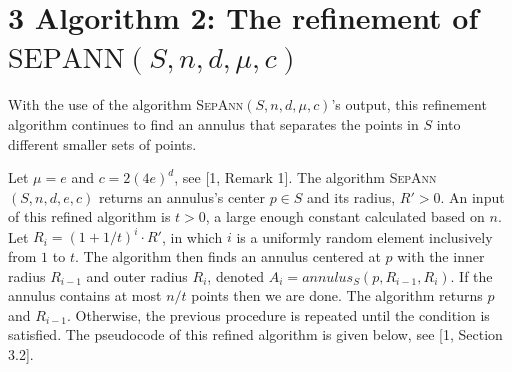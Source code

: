 \documentclass[12pt,english,]{article}
\newcommand{\pnt}[1]{{\scriptstyle#1}}
\let\origfigure\figure
\let\endorigfigure\endfigure
\renewenvironment{figure}[1][2] {
    \expandafter\origfigure\expandafter[H]
} {
    \endorigfigure
}
\begin{document}
\begin{figure}[!h]
\centering
{}
\caption{An example of generating points in grid. A set of 35 points that gives us a $5\times7$ grid. Points are placed at corners of the squares with side is $d$ which could be any number.}
\label{fig:grid}
\end{figure}

\hypertarget{algorithm-2-the-refinement-of-mathrmspntepapntnnsndmuc}{%
\section{\texorpdfstring{3 \enspace Algorithm 2: The refinement of
\(\mathrm{S\pnt{EP}A\pnt{NN}}(S,n,d,\mu,c)\)}{3 Algorithm 2: The refinement of \textbackslash{}mathrm\{S\textbackslash{}pnt\{EP\}A\textbackslash{}pnt\{NN\}\}(S,n,d,\textbackslash{}mu,c)}}\label{algorithm-2-the-refinement-of-mathrmspntepapntnnsndmuc}}

With the use of the algorithm \textsc{SepAnn$(S,n,d,\mu,c)$}'s output,
this refinement algorithm continues to find an annulus that separates
the points in \(S\) into different smaller sets of points.

Let \(\mu = e\) and \(c = 2(4e)^d\), see {[}1, Remark 1{]}. The
algorithm \textsc{SepAnn$(S,n,d,e,c)$} returns an annulus's center
\(p \in S\) and its radius, \(R'>0\). An input of this refined algorithm
is \(t > 0\), a large enough constant calculated based on \(n\). Let
\(R_i = (1+1/t)^i\cdot R'\), in which \(i\) is a uniformly random
element inclusively from \(1\) to \(t\). The algorithm then finds an
annulus centered at \(p\) with the inner radius \(R_{i-1}\) and outer
radius \(R_{i}\), denoted \(A_i = annulus_S(p, R_{i-1}, R_i)\). If the
annulus contains at most \(n/t\) points then we are done. The algorithm
returns \(p\) and \(R_{i-1}\). Otherwise, the previous procedure is
repeated until the condition is satisfied. The pseudocode of this
refined algorithm is given below, see {[}1, Section 3.2{]}.
\end{document}
